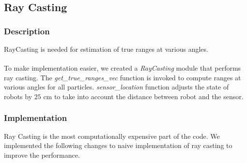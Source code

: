 \documentclass[12pt, a4paper]{article}
\begin{document}
\subsection{Ray Casting}
\subsubsection{Description}
RayCasting is needed for estimation of true ranges at various angles.\\\\ 
To make implementation easier, we created a \textit{RayCasting} module that performs ray casting. The \textit{get\_true\_ranges\_vec} function is invoked to compute ranges at various angles for all particles. \textit{sensor\_location} function adjusts the state of robots by $25$ cm to take into account the distance between robot and the sensor.
\subsubsection{Implementation}
Ray Casting is the most computationally expensive part of the code. We implemented the following changes to naive implementation of ray casting to improve the performance.
\end{document}

